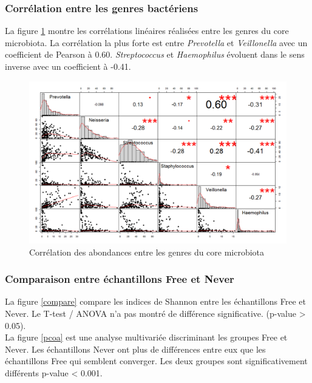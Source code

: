 \documentclass[12pt,a4paper]{article}
\begin{document}
\subsubsection{Corrélation entre les genres bactériens}
La figure \ref{correlation} montre les corrélations linéaires réalisées entre les genres du core microbiota. La corrélation la plus forte est entre \textit{Prevotella} et \textit{Veillonella} avec un coefficient de Pearson à 0.60.  \textit{Streptococcus} et \textit{Haemophilus} évoluent dans le sens inverse avec un coefficient à -0.41. 
 

\begin{figure}
\begin{center}
\includegraphics[scale=0.50]{img/small_correlation.png}\hfill
\end{center}
\caption{Corrélation des abondances entre les genres du core microbiota}
\label{correlation}
\end{figure}

\subsubsection{Comparaison entre échantillons Free et Never}
La figure \ref{compare} compare les indices de Shannon entre les échantillons Free et Never. Le T-test / ANOVA n'a pas montré de différence significative. (p-value > 0.05). \\
La figure  \ref{pcoa} est une analyse multivariée discriminant les groupes Free et Never. Les échantillons Never ont plus de différences entre eux que les échantillons Free qui semblent converger.  Les deux groupes sont significativement différents p-value < 0.001.
\end{document}
